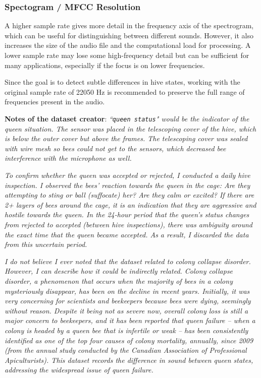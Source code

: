 \documentclass[12pt]{report}
\begin{document}
\subsubsection{Spectogram / MFCC Resolution}

\par A higher sample rate gives more detail in the frequency axis of the spectrogram, which can be useful for distinguishing between different sounds. However, it also increases the size of the audio file and the computational load for processing. A lower sample rate may lose some high-frequency detail but can be sufficient for many applications, especially if the focus is on lower frequencies.

\par Since the goal is to detect subtle differences in hive states, working with the original sample rate of 22050 Hz is recommended to preserve the full range of frequencies present in the audio.

\par\textbf{Notes of the dataset creator}: \textit{``{\tt queen status}" would be the indicator of the queen situation. The sensor was placed in the telescoping cover of the hive, which is below the outer cover but above the frames. The telescoping cover was sealed with wire mesh so bees could not get to the sensors, which decreased bee interference with the microphone as well.}

\par\textit{To confirm whether the queen was accepted or rejected, I conducted a daily hive inspection. I observed the bees' reaction towards the queen in the cage: Are they attempting to sting or ball (suffocate) her? Are they calm or excited? If there are 2+ layers of bees around the cage, it is an indication that they are aggressive and hostile towards the queen. In the 24-hour period that the queen's status changes from rejected to accepted (between hive inspections), there was ambiguity around the exact time that the queen became accepted. As a result, I discarded the data from this uncertain period.}

\par\textit{I do not believe I ever noted that the dataset related to colony collapse disorder. However, I can describe how it could be indirectly related. Colony collapse disorder, a phenomenon that occurs when the majority of bees in a colony mysteriously disappear, has been on the decline in recent years. Initially, it was very concerning for scientists and beekeepers because bees were dying, seemingly without reason. Despite it being not as severe now, overall colony loss is still a major concern to beekeepers, and it has been reported that queen failure -- when a colony is headed by a queen bee that is infertile or weak -- has been consistently identified as one of the top four causes of colony mortality, annually, since 2009 (from the annual study conducted by the Canadian Association of Professional Apiculturists). This dataset records the difference in sound between queen states, addressing the widespread issue of queen failure.}
\end{document}
